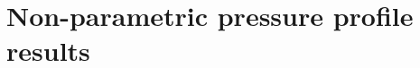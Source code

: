 \documentclass[onecolumn,traditabstract]{aa}
\begin{document}



\section{Non-parametric pressure profile results}
\label{sec:np_res}
\end{document}
